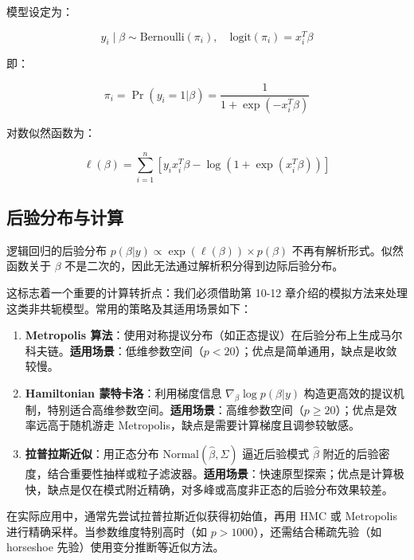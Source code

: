 模型设定为：

\begin{equation}
y_i \mid \beta \sim \text{Bernoulli}(\pi_i), \quad \text{logit}(\pi_i) = x_i^T\beta
\label{eq:logistic-regression-model}
\end{equation}

即：

\begin{equation}
\pi_i = \Pr(y_i = 1 | \beta) = \frac{1}{1 + \exp(-x_i^T\beta)}
\label{eq:logistic-link}
\end{equation}

对数似然函数为：

\begin{equation}
\ell(\beta) = \sum_{i=1}^n [y_i x_i^T\beta - \log(1 + \exp(x_i^T\beta))]
\label{eq:logistic-likelihood}
\end{equation}

\subsection{后验分布与计算}

逻辑回归的后验分布 $p(\beta | y) \propto \exp(\ell(\beta)) \times p(\beta)$ 不再有解析形式。似然函数关于 $\beta$ 不是二次的，因此无法通过解析积分得到边际后验分布。

这标志着一个重要的计算转折点：我们必须借助第 10-12 章介绍的模拟方法来处理这类非共轭模型。常用的策略及其适用场景如下：

\begin{enumerate}
  \item \textbf{Metropolis 算法}：使用对称提议分布（如正态提议）在后验分布上生成马尔科夫链。\textbf{适用场景}：低维参数空间（$p < 20$）；优点是简单通用，缺点是收敛较慢。
  \item \textbf{Hamiltonian 蒙特卡洛}：利用梯度信息 $\nabla_\beta \log p(\beta|y)$ 构造更高效的提议机制，特别适合高维参数空间。\textbf{适用场景}：高维参数空间（$p \geq 20$）；优点是效率远高于随机游走 Metropolis，缺点是需要计算梯度且调参较敏感。
  \item \textbf{拉普拉斯近似}：用正态分布 $\text{Normal}(\hat{\beta}, \Sigma)$ 逼近后验模式 $\hat{\beta}$ 附近的后验密度，结合重要性抽样或粒子滤波器。\textbf{适用场景}：快速原型探索；优点是计算极快，缺点是仅在模式附近精确，对多峰或高度非正态的后验分布效果较差。
\end{enumerate}

在实际应用中，通常先尝试拉普拉斯近似获得初始值，再用 HMC 或 Metropolis 进行精确采样。当参数维度特别高时（如 $p > 1000$），还需结合稀疏先验（如 horseshoe 先验）使用变分推断等近似方法。


